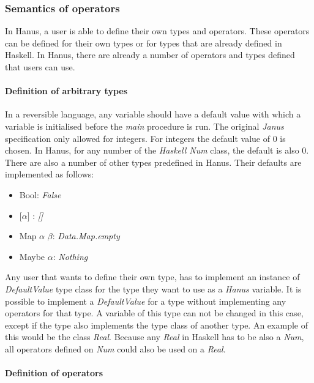 \documentclass[12pt,a4paper]{article}
\begin{document}
    \subsubsection{Semantics of operators}  
    In Hanus, a user is able to define their own types and operators. These operators can be defined for their own types or for types that are already defined in Haskell. In Hanus, there are already a number of operators and types defined that users can use. 
    \paragraph{Definition of arbitrary types}
    In a reversible language, any variable should have a default value with which a variable is initialised before the \textit{main} procedure is run. The original \textit{Janus} specification only allowed for integers. For integers the default value of 0 is chosen. In Hanus, for any number of the \textit{Haskell Num} class, the default is also 0. There are also a number of other types predefined in Hanus. Their defaults are implemented as follows:
    \begin{itemize}
        \item Bool: \textit{False}
        \item $\lbrack\alpha\rbrack$ : \textit{[]}
        \item Map $\alpha$ $\beta$: \textit{Data.Map.empty}
        \item Maybe $\alpha$: \textit{Nothing}
    \end{itemize}
    Any user that wants to define their own type, has to implement an instance of \textit{DefaultValue} type class for the type they want to use as a \textit{Hanus} variable. It is possible to implement a \textit{DefaultValue} for a type without implementing any operators for that type. A variable of this type can not be changed in this case, except if the type also implements the type class of another type. An example of this would be the class \textit{Real}. Because any \textit{Real} in Haskell has to be also a \textit{Num}, all operators defined on \textit{Num} could also be used on a \textit{Real}.
    
    \paragraph{Definition of operators}
\end{document}
